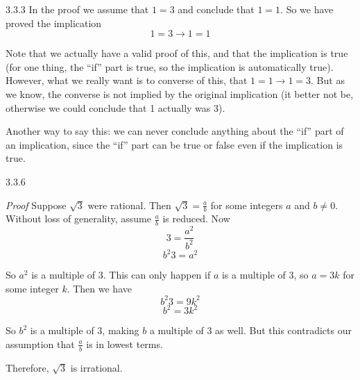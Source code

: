 \documentclass[11pt,]{book}
\makeatletter
\theoremstyle{ptxplainnotitle}
\theoremstyle{ptxplaintitle}
\renewcommand*{\proofname}{Proof}
\renewenvironment{proof}[1][\proofname]{\par
  \pushQED{\qed}%
  \normalfont \topsep6\p@\@plus6\p@\relax
  \trivlist
  \item\relax
    {\itshape
    #1\@addpunct{.}}\hspace\labelsep\ignorespaces
}{%
  \popQED\endtrivlist\@endpefalse
}
\theoremstyle{ptxdefinitionnotitle}
\theoremstyle{ptxdefinitiontitle}
\theoremstyle{ptxdefinitionnotitle}
\theoremstyle{ptxdefinitiontitle}
\theoremstyle{ptxdefinitionnotitle}
\theoremstyle{ptxdefinitiontitle}
\theoremstyle{ptxdefinitiontitlenonumber}
\theoremstyle{ptxdefinitiontitlenonumber}
\numberwithin{equation}{chapter}
\newcommand{\imp}{\rightarrow}
\makeatother
\begin{document}
\begin{divisionexercise}{3.3.3}
\textbf{}\hypertarget{p-2393}{}%
In the proof we assume that \(1=3\) and conclude that \(1=1\). So we have proved the implication%
\begin{equation*}
1=3 \imp 1=1
\end{equation*}
%
\par
\hypertarget{p-2394}{}%
Note that we actually have a valid proof of this, and that the implication is true (for one thing, the ``if'' part is true, so the implication is automatically true). However, what we really want is to converse of this, that \(1=1 \imp 1=3\). But as we know, the converse is not implied by the original implication (it better not be, otherwise we could conclude that 1 actually was 3).%
\par
\hypertarget{p-2395}{}%
Another way to say this: we can never conclude anything about the ``if'' part of an implication, since the ``if'' part can be true or false even if the implication is true.%
\end{divisionexercise}%
\begin{divisionexercise}{3.3.6}
\textbf{}\begin{proof}\hypertarget{proof-33}{}
\hypertarget{p-2408}{}%
Suppose \(\sqrt{3}\) were rational. Then \(\sqrt{3} = \frac{a}{b}\) for some integers \(a\) and \(b \ne 0\). Without loss of generality, assume \(\frac{a}{b}\) is reduced. Now%
\begin{equation*}
3 = \frac{a^2}{b^2}
\end{equation*}
%
\begin{equation*}
b^2 3 = a^2
\end{equation*}
%
\par
\hypertarget{p-2409}{}%
So \(a^2\) is a multiple of 3. This can only happen if \(a\) is a multiple of 3, so \(a = 3k\) for some integer \(k\). Then we have%
\begin{equation*}
b^2 3 = 9k^2
\end{equation*}
%
\begin{equation*}
b^2 = 3k^2
\end{equation*}
%
\par
\hypertarget{p-2410}{}%
So \(b^2\) is a multiple of 3, making \(b\) a multiple of 3 as well. But this contradicts our assumption that \(\frac{a}{b}\) is in lowest terms.%
\par
\hypertarget{p-2411}{}%
Therefore, \(\sqrt{3}\) is irrational.%
\end{proof}
\end{divisionexercise}%
\end{document}
